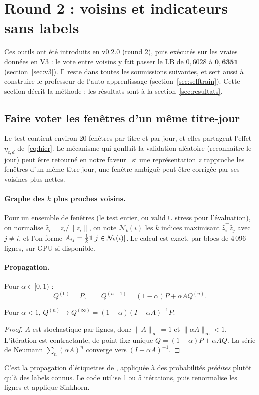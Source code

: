 \section{Round 2 : voisins et indicateurs sans labels}\label{sec:voisins}

Ces outils ont été introduits en v0.2.0 (round 2), puis exécutés sur les vraies données en V3 : le vote entre voisins y fait passer le LB de $0{,}6028$ à $\mathbf{0{,}6351}$ (section~\ref{sec:v3}). Il reste dans toutes les soumissions suivantes, et sert aussi à construire le professeur de l'auto-apprentissage (section~\ref{sec:selftrain}). Cette section décrit la méthode ; les résultats sont à la section~\ref{sec:resultats}.

\subsection{Faire voter les fenêtres d'un même titre-jour}
Le test contient environ 20 fenêtres par titre et par jour, et elles partagent l'effet $\eta_{c,d}$ de~\eqref{eq:hier}. Le mécanisme qui gonflait la validation aléatoire (reconnaître le jour) peut être retourné en notre faveur : si une représentation $z$ rapproche les fenêtres d'un même titre-jour, une fenêtre ambiguë peut être corrigée par ses voisines plus nettes.

\paragraph{Graphe des $k$ plus proches voisins.} Pour un ensemble de fenêtres (le test entier, ou valid $\cup$ stress pour l'évaluation), on normalise $\hat z_i=z_i/\|z_i\|$, on note $\mathcal{N}_k(i)$ les $k$ indices maximisant $\hat z_i^\top\hat z_j$ avec $j\neq i$, et l'on forme $A_{ij}=\frac1k\mathbf{1}\!\left[j\in\mathcal{N}_k(i)\right]$. Le calcul est exact, par blocs de 4\,096 lignes, sur GPU si disponible.

\paragraph{Propagation.} Pour $\alpha\in[0,1)$ :
\begin{equation}
Q^{(0)}=P,\qquad Q^{(n+1)}=(1-\alpha)P+\alpha AQ^{(n)} .
\end{equation}
\begin{proposition}
Pour $\alpha<1$, $Q^{(n)}\to Q^{(\infty)}=(1-\alpha)(I-\alpha A)^{-1}P$.
\end{proposition}
\begin{proof}
$A$ est stochastique par lignes, donc $\|A\|_\infty=1$ et $\|\alpha A\|_\infty<1$. L'itération est contractante, de point fixe unique $Q=(1-\alpha)P+\alpha AQ$. La série de Neumann $\sum_n(\alpha A)^n$ converge vers $(I-\alpha A)^{-1}$.
\end{proof}
\noindent C'est la propagation d'étiquettes de \cite{zhou}, appliquée à des probabilités \emph{prédites} plutôt qu'à des labels connus. Le code utilise 1 ou 5 itérations, puis renormalise les lignes et applique Sinkhorn.

